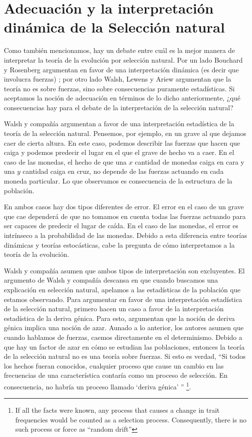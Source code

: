 \section{Adecuación y la interpretación dinámica de la Selección natural}

 \noindent Como también mencionamos, hay un debate entre cuál es la mejor manera de interpretar la teoría de la evolución por selección natural. Por un lado Bouchard y Rosenberg argumentan en favor de una interpretación dinámica (es decir que involucra fuerzas) \citeyear{Bouchard2004}; por otro lado Walsh, Lewens y Ariew \citeyear{Walsh2002} argumentan que la teoría no es sobre fuerzas, sino sobre consecuencias puramente estadísticas. Si aceptamos la noción de adecuación en términos de lo dicho anteriormente, ¿qué consecuencias hay para el debate de la interpretación de la selección natural?

 Walsh y compañía argumentan a favor de una interpretación estadística de la teoría de la selección natural. Pensemos, por ejemplo, en un grave al que dejamos caer de cierta altura. En este caso, podemos describir las fuerzas que hacen que caiga y podemos predecir el lugar en el que el grave de hecho va a caer. En el caso de las monedas, el hecho de que una $x$ cantidad de monedas caiga en cara y una $y$ cantidad caiga en cruz, no depende de las fuerzas actuando en cada moneda particular. Lo que observamos es consecuencia de la estructura de la población.

 En ambos casos hay dos tipos diferentes de error. El error en el caso de un grave que cae dependerá de que no tomamos en cuenta todas las fuerzas actuando para ser capaces de predecir el lugar de caída. En el caso de las monedas, el error es intrínseco a la probabilidad de las monedas. Debido a esta diferencia entre teorías dinámicas y teorías estocásticas, cabe la pregunta de cómo interpretamos a la teoría de la evolución.

 Walsh y compañía asumen que ambos tipos de interpretación son excluyentes. El argumento de Walsh y compañía descansa en que cuando buscamos una explicación en selección natural, apelamos a las estadísticas de la población que estamos observando. Para argumentar en favor de una interpretación estadística de la selección natural, primero hacen un caso a favor de la interpretación estadística de la deriva génica. Para esto, argumentan que la noción de deriva génica implica una noción de azar. Aunado a lo anterior, los autores asumen que cuando hablamos de fuerzas, caemos directamente en el determinismo. Debido a que hay un factor de azar en cómo se estudian las poblaciones, entonces la teoría de la selección natural no es una teoría sobre fuerzas. Si esto es verdad, ``Si todos los hechos fueran conocidos, cualquier proceso que cause un cambio en las frecuencias de una característica contaría como un proceso de selección. En consecuencia, no habría un proceso llamado `deriva génica' '' \citeyear[p. 457]{Walsh2002} \footnote{If all the facts were known, any process that causes a change in trait frequencies would be counted as a selection process. Consequently, there is no such process or force as ``random drift''}.

